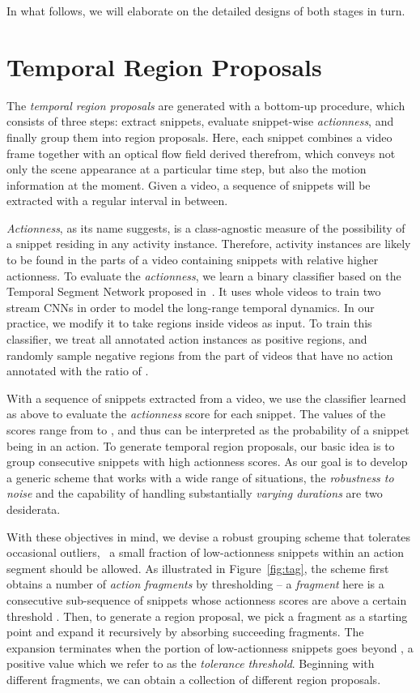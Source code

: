 \documentclass[10pt,twocolumn,letterpaper]{article}
\begin{document}
In what follows, we will elaborate on the detailed designs of both stages in turn.   


 
\section{Temporal Region Proposals}
\label{sec:proposal}




The \emph{temporal region proposals} are generated with a bottom-up procedure,
which consists of three steps: 
extract snippets, evaluate snippet-wise \emph{actionness}, and 
finally group them into region proposals. 
Here, each snippet combines a video frame together with an optical flow field
derived therefrom, which conveys not only the scene appearance at a particular time step, 
but also the motion information at the moment. 
Given a video, a sequence of snippets will be extracted with a regular interval in between. 

\emph{Actionness}, as its name suggests, is a class-agnostic measure of the possibility of a snippet residing in any activity instance.
Therefore, activity instances are likely to be found in the parts of a video containing snippets with relative higher actionness.
To evaluate the \emph{actionness}, we learn a binary classifier based on 
the Temporal Segment Network proposed in~\cite{Wang2016TSN}.
It uses whole videos to train two stream CNNs in order to model the long-range temporal dynamics.
In our practice, we modify it to take regions inside videos as input.
To train this classifier, we treat all annotated action instances
as positive regions, and randomly sample negative regions from the part of videos that have no action annotated with the ratio of . 



With a sequence of snippets extracted from a video, 
we use the classifier learned as above to evaluate the \emph{actionness} score
for each snippet. 
The values of the scores range from  to , and thus can be interpreted
as the probability of a snippet being in an action.
To generate temporal region proposals, our basic idea is to 
group consecutive snippets with high actionness scores. 
As our goal is to develop a generic scheme that works with a wide range of 
situations, the \emph{robustness to noise} and the capability of handling 
substantially \emph{varying durations} are two desiderata.

With these objectives in mind, 
we devise a robust grouping scheme that tolerates occasional outliers,
\eg~a small fraction of low-actionness snippets within an action segment
should be allowed. 
As illustrated in Figure~\ref{fig:tag}, the scheme first obtains a number of 
\emph{action fragments} by thresholding -- a \emph{fragment} here is a
consecutive sub-sequence of snippets whose actionness scores are above
a certain threshold . 
Then, to generate a region proposal, we pick a fragment as a starting point
and expand it recursively by absorbing succeeding fragments.
The expansion terminates when the portion of low-actionness snippets goes beyond 
, a positive value which we refer to as the \emph{tolerance threshold}.
Beginning with different fragments, we can obtain a collection of 
different region proposals.
\end{document}

